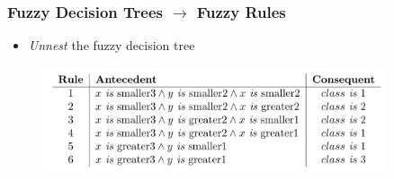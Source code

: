 \documentclass[
	10pt,
	t		%
]{beamer}
\begin{document}
\begin{frame}

	\frametitle{Fuzzy Decision Trees $\rightarrow$ Fuzzy Rules}
	
	\begin{itemize}
		\item \textit{Unnest} the fuzzy decision tree
	\end{itemize}
	
	\begin{figure}
		\centering
		\includegraphics[width=0.9\textwidth]{figures/extracted-rules.png}
	\end{figure}
	
\end{frame}
\end{document}
